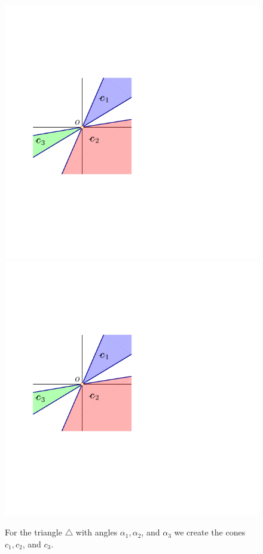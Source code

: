 \begin{figure}[h]
    \centering \phantom{}%
    \hfill%
    \includegraphics[page=1]{figs/triangle_cones}%
    \hfill%
    \includegraphics[page=2]{figs/triangle_cones}%
    \hfill%
    \phantom{}%
    \caption{For the triangle $\triangle$ with angles
       $\alpha_1,\alpha_2$, and $\alpha_3$ we create the cones
       $c_1,c_2$, and $c_3$.}
\end{figure}


